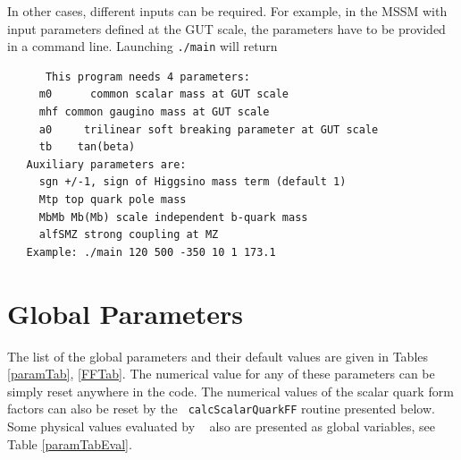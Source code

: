 \documentclass[12pt,a4paper]{article}
\begin{document}
In other cases, different inputs can be required. For example, in the MSSM with input parameters defined at the GUT scale,
the parameters have to be provided in a command line. Launching \verb|./main| will return 
\begin{verbatim}
      This program needs 4 parameters:
     m0      common scalar mass at GUT scale
     mhf common gaugino mass at GUT scale
     a0     trilinear soft breaking parameter at GUT scale
     tb    tan(beta)
   Auxiliary parameters are:
     sgn +/-1, sign of Higgsino mass term (default 1)
     Mtp top quark pole mass
     MbMb Mb(Mb) scale independent b-quark mass
     alfSMZ strong coupling at MZ
   Example: ./main 120 500 -350 10 1 173.1
\end{verbatim}



\section{Global Parameters}

 The list of the
global parameters  and their default values  are given  in Tables
\ref{paramTab}, \ref{FFTab}. 
The numerical value for any of these parameters can be simply reset anywhere in the code. 
The numerical values of  the scalar quark form factors can also be reset by the {\tt
calcScalarQuarkFF} routine presented below. Some physical values  evaluated by \micro~  also are presented as global variables,  see Table \ref{paramTabEval}. 
\end{document}
